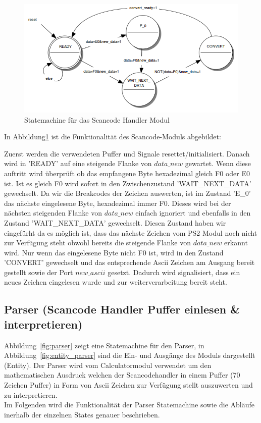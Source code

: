 \begin{figure}[!ht]
	\centering
	\includegraphics[scale=0.4]{figures/scancode.png} 
	\caption{Statemachine für das Scancode Handler Modul}
	\label{fig:scan}
\end{figure}


In Abbildung\ref{fig:scan}  ist die Funktionalität des Scancode-Moduls abgebildet:

Zuerst werden die verwendeten Puffer und Signale resettet/initialisiert. Danach wird in 'READY' auf eine steigende Flanke von $data\_new$ gewartet. Wenn diese auftritt wird überprüft ob das empfangene Byte hexadezimal gleich F0 oder E0 ist. Ist es gleich F0 wird sofort in den Zwischenzustand 'WAIT\_NEXT\_DATA' gewechselt. Da wir die Breakcodes der Zeichen auswerten, ist im Zustand 'E\_0' das nächste eingelesene Byte, hexadezimal immer F0. Dieses wird bei der nächsten steigenden Flanke von $data\_new$ einfach ignoriert und ebenfalls in den Zustand 'WAIT\_NEXT\_DATA' gewechselt.
Diesen Zustand haben wir eingefürht da es möglich ist, dass das nächste Zeichen vom PS2 Modul noch nicht zur Verfügung steht obwohl bereits die steigende Flanke von $data\_new$ erkannt wird.
Nur wenn das eingelesene Byte nicht F0 ist, wird in den Zustand 'CONVERT' gewechselt und das entsprechende Ascii Zeichen am Ausgang bereit gestellt sowie der Port $new\_ascii$ gesetzt. Dadurch wird signalisiert, dass ein neues Zeichen eingelesen wurde und zur weiterverarbeitung bereit steht.  


\subsection{Parser (Scancode Handler Puffer einlesen \& interpretieren)}

Abbildung~\ref{fig:parser} zeigt eine Statemachine für den Parser, in Abbildung~\ref{fig:entity_parser} sind die Ein- und Ausgänge des Moduls dargestellt (Entity). Der Parser wird vom Calculatormodul verwendet um den mathematischen Ausdruck welchen der Scancodehandler in einem Puffer (70 Zeichen Puffer) in Form von Ascii Zeichen zur Verfügung stellt auszuwerten und zu interpretieren. \\
Im Folgenden wird die Funktionalität der Parser Statemachine sowie die Abläufe inerhalb der einzelnen States genauer beschrieben.

